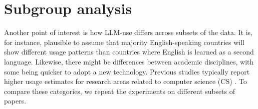\section{Subgroup analysis}
Another point of interest is how LLM-use differs across subsets of the data.
It is, for instance, plausible to assume that majority English-speaking countries will show different usage patterns than countries where English is learned as a second language.
Likewise, there might be differences between academic disciplines, with some being quicker to adopt a new technology.
Previous studies typically report higher usage estimates for research areas related to computer science (CS) \cite{Liang2024_paper, Liang2025}.
To compare these categories, we repeat the experiments on different subsets of papers.

